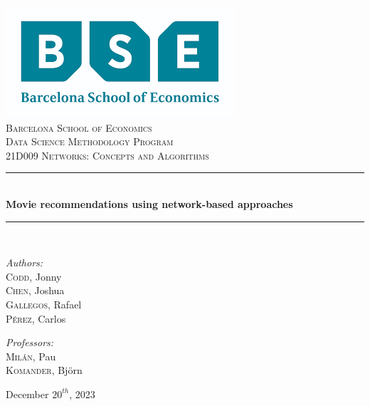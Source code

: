 \documentclass[12pt]{article}
\date{\today}							%
\numberwithin{equation}{section}
\begin{document}
\begin{titlepage}
	\centering
    \includegraphics[scale = 0.7]{bse_logo.png}\\[1.2 cm]	%
    \textsc{\LARGE Barcelona School of Economics}\\[2.0 cm]	%
	\textsc{\Large Data Science Methodology Program}\\[0.5 cm]				%
	\textsc{\large 21D009 Networks: Concepts and Algorithms }\\[0.5 cm]				%
	\rule{\linewidth}{0.2 mm} \\[0.4 cm]
	{ \huge \bfseries Movie recommendations using network-based approaches }\\
	\rule{ \linewidth}{0.2 mm} \\[1.5 cm]
	
\begin{center}
    
{ \emph{Authors: }\\
    \textsc{Codd}, Jonny \\
    \textsc{Chen}, Joshua \\
    \textsc{Gallegos}, Rafael \\
    \textsc{Pérez}, Carlos \\ } 

\vspace{0.7cm}


    \textit{Professors:}\\  \textsc{Milán}, Pau \\
    	\textsc{Komander}, Björn
        \\ \vspace{0.5cm}


\vspace{1.7cm}


{\large December $20^{th}$, 2023} \\[2 cm]

 \end{center}
	\vfill
	
\end{titlepage}
	
\end{document}
